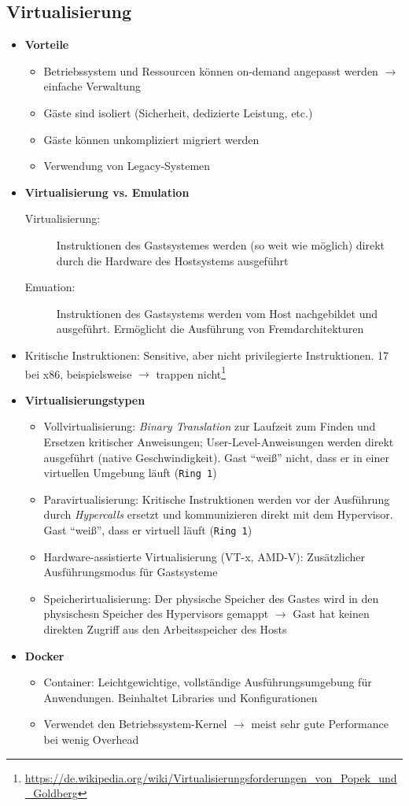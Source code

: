 \subsection{Virtualisierung}
\begin{itemize}
	\item \textbf{Vorteile}
	\begin{itemize}
		\item Betriebssystem und Ressourcen können on-demand angepasst werden \(\rightarrow\) einfache Verwaltung
		\item Gäste sind isoliert (Sicherheit, dedizierte Leistung, etc.)
		\item Gäste können unkompliziert migriert werden
		\item Verwendung von Legacy-Systemen
	\end{itemize}
	\item \textbf{Virtualisierung vs. Emulation}
	\begin{description}
		\item[Virtualisierung:] Instruktionen des Gastsystemes werden (so weit wie möglich) direkt durch die Hardware des Hostsystems ausgeführt
		\item[Emuation:] Instruktionen des Gastsystems werden vom Host nachgebildet und ausgeführt. Ermöglicht die Ausführung von Fremdarchitekturen
	\end{description}
	\item Kritische Instruktionen: Sensitive, aber nicht privilegierte Instruktionen. 17 bei x86, beispielsweise  \(\rightarrow\) trappen nicht\footnote{\url{https://de.wikipedia.org/wiki/Virtualisierungsforderungen_von_Popek_und_Goldberg}}
	\item \textbf{Virtualisierungstypen}
	\begin{itemize}
		\item Vollvirtualisierung: \textit{Binary Translation} zur Laufzeit zum Finden und Ersetzen kritischer Anweisungen; User-Level-Anweisungen werden direkt ausgeführt (native Geschwindigkeit). Gast "`weiß"' nicht, dass er in einer virtuellen Umgebung läuft (\texttt{Ring 1})
		\item Paravirtualisierung: Kritische Instruktionen werden vor der Ausführung durch \textit{Hypercalls} ersetzt und kommunizieren direkt mit dem Hypervisor. Gast "`weiß"', dass er virtuell läuft (\texttt{Ring 1})
		\item Hardware-assistierte Virtualisierung (VT-x, AMD-V): Zusätzlicher Ausführungsmodus für Gastsysteme
		\item Speicherirtualisierung: Der physische Speicher des Gastes wird in den physischesn Speicher des Hypervisors gemappt \(\rightarrow\) Gast hat keinen direkten Zugriff aus den Arbeitsspeicher des Hosts
	\end{itemize}
	\item \textbf{Docker}
	\begin{itemize}
		\item Container: Leichtgewichtige, vollständige Ausführungsumgebung für Anwendungen. Beinhaltet Libraries und Konfigurationen
		\item Verwendet den Betriebssystem-Kernel \(\rightarrow\) meist sehr gute Performance bei wenig Overhead
	\end{itemize}
\end{itemize}
